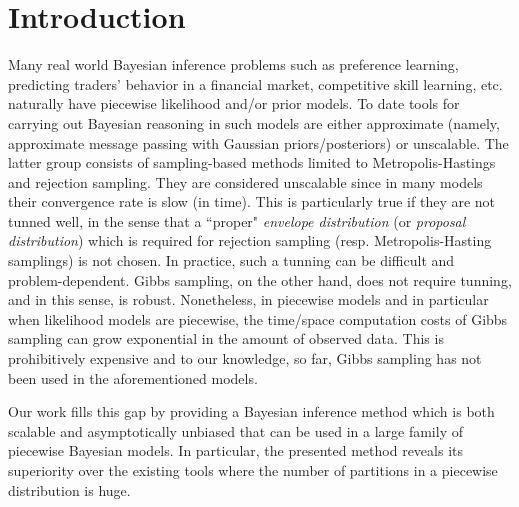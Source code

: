 \section{Introduction}

Many real world Bayesian inference problems such as preference learning, predicting traders’ behavior in a financial market, competitive skill learning, etc. naturally have piecewise likelihood and/or prior models. To date tools for carrying out Bayesian reasoning in such models are either approximate (namely, approximate message passing with Gaussian priors/posteriors) or unscalable. The latter group consists of sampling-based methods limited to Metropolis-Hastings and rejection sampling. They are considered unscalable since in many models their convergence rate is slow (in time). 
This is particularly true if they are not tunned well, in the sense that 
a ``proper" \emph{envelope distribution} (or \emph{proposal distribution}) 
which is required for rejection sampling (resp. Metropolis-Hasting samplings) is not chosen.
In practice, such a tunning can be difficult and problem-dependent. 
Gibbs sampling, on the other hand, does not require tunning, and in this sense, is robust.
Nonetheless, in piecewise models and in particular when likelihood models are piecewise,
the time/space computation costs of Gibbs sampling can grow exponential in the amount of observed data.    This is prohibitively expensive 
and to our knowledge, so far, Gibbs sampling has not been used in the aforementioned models. 

Our work fills this gap by providing a Bayesian inference method which is both scalable and asymptotically unbiased that can be used in a large family of piecewise Bayesian models. 
In particular, the presented method reveals its superiority over the existing tools where the number of partitions in a piecewise distribution is huge.    

